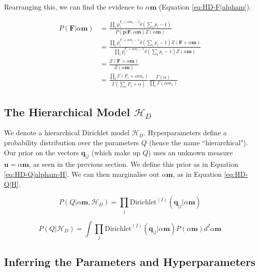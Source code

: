 \noindent Rearranging this, we can find the evidence to $\alpha\boldsymbol{m}$ (Equation \ref{eq:HD-F|alpham}).

\begin{align}
P(\boldsymbol{F}|\alpha\boldsymbol{m})&=\frac{\prod_{i}p_{i}^{F_{i}+\alpha m_{i}-1}\delta(\sum_{i}p_{i}-1)}{P(\boldsymbol{p}|\boldsymbol{F},\alpha\boldsymbol{m})Z(\alpha\boldsymbol{m})} \nonumber
\\
&=\frac{\prod_{i}p_{i}^{F_{i}+\alpha m_{i}-1}\delta(\sum_{i}p_{i}-1)Z(\boldsymbol{F}+\alpha\boldsymbol{m})}{\prod_{i}p_{i}^{F_{i}+\alpha m_{i}-1}\delta(\sum_{i}p_{i}-1)Z(\alpha\boldsymbol{m})} \nonumber
\\
&=\frac{Z(\boldsymbol{F}+\alpha\boldsymbol{m})}{Z(\alpha\boldsymbol{m})} \nonumber
\\
&=\frac{\prod_{i}\Gamma(F_{i}+\alpha m_{i})}{\Gamma(\sum_{i}F_{i}+\alpha)}\frac{\Gamma(\alpha)}{\prod_{i}\Gamma(\alpha m_{i})}
\label{eq:HD-F|alpham}
\end{align}

\subsection{The Hierarchical Model $\mathscr{H}_{D}$}

We denote a hierarchical Dirichlet model $\mathscr{H}_{D}$. Hyperparameters define a probability distribution over the parameters $Q$ (hence the name ``hierarchical"). Our prior on the vectors $\boldsymbol{q}_{|j}$ (which make up $Q$) uses an unknown measure $\boldsymbol{u}=\alpha\boldsymbol{m}$, as seen in the previous section. We define this prior as in Equation \ref{eq:HD-Q|alpham-H}. We can then marginalise out $\alpha\boldsymbol{m}$, as in Equation \ref{eq:HD-Q|H}.

\begin{equation}
P(Q|\alpha\boldsymbol{m},\mathscr{H}_{D})=\prod_{j}\text{Dirichlet}^{(I)}(\boldsymbol{q}_{|j}|\alpha\boldsymbol{m})
\label{eq:HD-Q|alpham-H}
\end{equation}

\begin{equation}
P(Q|\mathscr{H}_{D})=\int\prod_{j}\text{Dirichlet}^{(I)}(\boldsymbol{q}_{|j}|\alpha\boldsymbol{m})P(\alpha\boldsymbol{m})d^{I}\alpha\boldsymbol{m}
\label{eq:HD-Q|H}
\end{equation}

\subsection{Inferring the Parameters and Hyperparameters}

